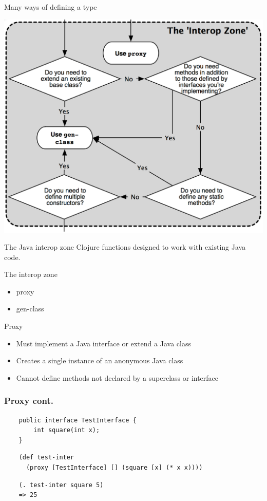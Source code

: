 \documentclass[xcolor=dvipsnames]{beamer}
\begin{document}
		\begin{frame}{Many ways of defining a type}
		\begin{center}
			\includegraphics[scale=.15]{choosingtypeformszoom.png}
		\end{center}
		\end{frame}
		
		\begin{frame}{The Java interop zone}
			Clojure functions designed to work with existing Java code.
			\begin{block}{The interop zone}
			\begin{itemize}			
			\item proxy
			\item gen-class
			\end{itemize}
			\end{block}
		\end{frame}

	
	\begin{frame}{Proxy}
	\begin{itemize}
	\item Must implement a Java interface or extend a Java class
	\item Creates a single instance of an anonymous Java class
	\item Cannot define methods not declared by a superclass or interface
	\end{itemize}
	\end{frame}	

	\begin{frame}[fragile]
	\frametitle{Proxy cont.}
	\begin{verbatim}
	public interface TestInterface {
		int square(int x);
	}
	\end{verbatim}
	\pause
	\begin{verbatim}
	(def test-inter 
	  (proxy [TestInterface] [] (square [x] (* x x))))
	\end{verbatim}
	\pause
	\begin{verbatim}
	(. test-inter square 5)
	=> 25
	\end{verbatim}
	\end{frame}
	
\end{document}
